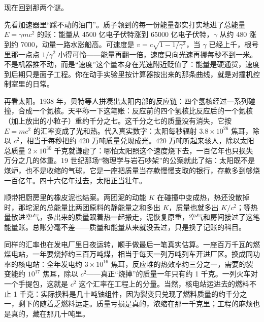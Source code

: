 
\begin{mainline}
现在回到那两个谜。

先看加速器里“踩不动的油门”。质子领到的每一份能量都实打实地进了总能量 \(E=\gamma mc^{2}\) 的账：能量从 4500 亿电子伏特涨到 65000 亿电子伏特，\(\gamma\) 从约 480 涨到约 7000，动量一路水涨船高。可速度是 \(v=c\sqrt{1-1/\gamma^{2}}\)，当 \(\gamma\) 已经上千，根号里那一点点 \(1/\gamma^{2}\) 小得可怜——能量再翻一倍，速度只向光速再挪每秒不到一米。不是机器推不动，而是“速度”这个量本身在光速附近贬值了：能量是硬通货，速度到后期只是面子工程。你在动手实验里按计算器按出来的那条曲线，就是对撞机控制室里的日常。

再看太阳。1938 年，贝特等人拼凑出太阳内部的反应链：四个氢核经过一系列碰撞，合成一个氦核。天平称一下这笔账：反应前的四个氢核比反应后的一个氦核（加上放出的小粒子）重约千分之七。这千分之七的质量没有消失，它按 \(E=mc^{2}\) 的汇率变成了光和热。代入真实数字：太阳每秒辐射 \(3.8\times10^{26}\) 焦耳，除以 \(c^{2}\)，相当于每秒把约 420 万吨质量兑现成光。420 万吨听起来骇人，除以太阳总质量 \(2\times10^{30}\) 千克就谦虚了：哪怕太阳照这个速度烧下去，一百亿年也只损失万分之几的体重。19 世纪那场“物理学与岩石吵架”的公案就此了结：太阳既不是煤炉，也不是收缩的气球，它是一座把质量当存款慢慢支取的银行，存款多到够烧一百亿年。四十六亿年过去，太阳正当壮年。

顺带把厨房里的橡皮泥也结案。两团泥的动能 \(K\) 在碰撞中变成热，热还没散掉时，那坨泥的总能量比两团原料的静能量之和多出 \(K\)，质量也就多出 \(K/c^{2}\)；等热量散进空气，多出来的质量跟着热一起搬走，泥恢复原重，空气和房间接过了这笔能量账。总账分毫不差——质量和能量从来就没丢过，只是换了记账的科目。

同样的汇率也在发电厂里日夜运转，顺手做最后一笔真实估算。一座百万千瓦的燃煤电站，一年要烧掉约三百万吨煤，相当于每天一列万吨列车开进厂区。换成同功率的核电站：全年发电约 \(3\times10^{16}\) 焦耳，反应堆的热效率约三分之一，需要的裂变能约 \(10^{17}\) 焦耳，除以 \(c^{2}\)——真正“烧掉”的质量一年只有约 1 千克。一列火车对一个手提包，这就是 \(c^{2}\) 这个汇率在工程上的分量。当然，核电站运进去的燃料不止 1 千克：实际换料是几十吨铀组件，因为裂变只兑现了燃料质量的约千分之一，剩下的随着乏燃料运走。质量亏损是真的，浓缩在那一千克里；工程的麻烦也是真的，藏在那几十吨里。
\end{mainline}


